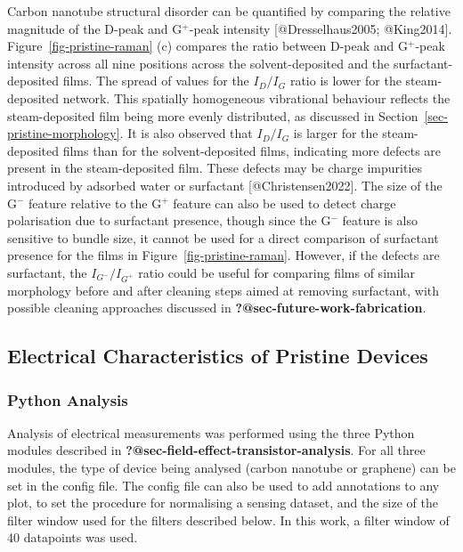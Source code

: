 \documentclass[
  letterpaper,
  DIV=11,
  numbers=noendperiod]{scrartcl}
\begin{document}
Carbon nanotube structural disorder can be quantified by comparing the
relative magnitude of the D-peak and G\(^+\)-peak intensity
{[}@Dresselhaus2005; @King2014{]}. Figure~\ref{fig-pristine-raman} (c)
compares the ratio between D-peak and G\(^+\)-peak intensity across all
nine positions across the solvent-deposited and the surfactant-deposited
films. The spread of values for the \(I_D/I_G\) ratio is lower for the
steam-deposited network. This spatially homogeneous vibrational
behaviour reflects the steam-deposited film being more evenly
distributed, as discussed in Section~\ref{sec-pristine-morphology}. It
is also observed that \(I_D/I_G\) is larger for the steam-deposited
films than for the solvent-deposited films, indicating more defects are
present in the steam-deposited film. These defects may be charge
impurities introduced by adsorbed water or surfactant
{[}@Christensen2022{]}. The size of the G\(^-\) feature relative to the
G\(^+\) feature can also be used to detect charge polarisation due to
surfactant presence, though since the G\(^-\) feature is also sensitive
to bundle size, it cannot be used for a direct comparison of surfactant
presence for the films in Figure~\ref{fig-pristine-raman}. However, if
the defects are surfactant, the \(I_{G^-}/I_{G^+}\) ratio could be
useful for comparing films of similar morphology before and after
cleaning steps aimed at removing surfactant, with possible cleaning
approaches discussed in \textbf{?@sec-future-work-fabrication}.

\hypertarget{sec-pristine-electrical-characterisation}{%
\subsection{Electrical Characteristics of Pristine
Devices}\label{sec-pristine-electrical-characterisation}}

\hypertarget{sec-python-analysis}{%
\subsubsection{Python Analysis}\label{sec-python-analysis}}

Analysis of electrical measurements was performed using the three Python
modules described in \textbf{?@sec-field-effect-transistor-analysis}.
For all three modules, the type of device being analysed (carbon
nanotube or graphene) can be set in the config file. The config file can
also be used to add annotations to any plot, to set the procedure for
normalising a sensing dataset, and the size of the filter window used
for the filters described below. In this work, a filter window of 40
datapoints was used.
\end{document}

